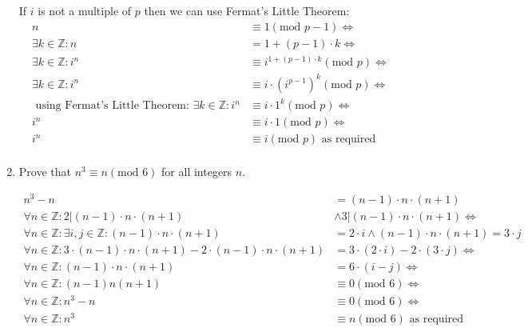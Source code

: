 \documentclass[10pt,\jkfside,a4paper]{article}
\begin{document}
\begin{enumerate}
If $i$ is not a multiple of $p$ then we can use Fermat's Little Theorem:
\begin{equation}
\begin{split}
n &\equiv 1(\text{mod } p - 1)\Longleftrightarrow\\
\exists k\in\mathbb{Z}: n &= 1 + (p - 1)\cdot k \Longleftrightarrow\\
\exists k \in \mathbb{Z}: i^n &\equiv i^{1 + (p-1)\cdot k}(\text{mod } p)\Longleftrightarrow\\
\exists k\in\mathbb{Z}: i^n &\equiv i \cdot (i^{p - 1})^k (\text{mod } p)\Longleftrightarrow\\
\text{ using Fermat's Little Theorem: } \exists k\in\mathbb{Z}: i^n &\equiv i \cdot 1^k (\text{mod } p) \Longleftrightarrow\\
i^n &\equiv i \cdot 1 (\text{mod } p) \Longleftrightarrow\\
i^n &\equiv i (\text{mod } p)\text{ as required}\\
\end{split}
\end{equation}

\item Prove that $n^3\equiv n (\text{mod } 6)$ for all integers $n$.

\begin{equation}
\begin{split}
n^3 - n &= (n-1)\cdot n\cdot (n+1)\\
\forall n \in \mathbb{Z}: 2|(n - 1)\cdot n\cdot (n+1) &\wedge 3|(n-1)\cdot n\cdot (n+1)\Longleftrightarrow\\
\forall n \in \mathbb{Z}: \exists i, j \in \mathbb{Z}: (n-1)\cdot n\cdot(n+1) &= 2\cdot i \wedge (n-1)\cdot n\cdot(n+1) = 3\cdot j\\
\forall n \in \mathbb{Z}: 3\cdot(n-1)\cdot n\cdot(n+1) - 2\cdot (n-1)\cdot n\cdot(n+1) &= 3\cdot(2\cdot i) -2\cdot (3\cdot j)\Longleftrightarrow\\
\forall n \in \mathbb{Z}: (n-1)\cdot n\cdot(n+1) &= 6\cdot (i - j)\Longleftrightarrow\\
\forall n \in \mathbb{Z}: (n - 1)n(n+1) &\equiv 0(\text{mod } 6) \Longleftrightarrow\\
\forall n \in \mathbb{Z}: n^3 - n &\equiv 0(\text{mod } 6) \Longleftrightarrow\\
\forall n \in \mathbb{Z}: n^3 &\equiv n(\text{mod } 6) \text{ as required}\\
\end{split}
\end{equation}


\end{enumerate}
\end{document}
